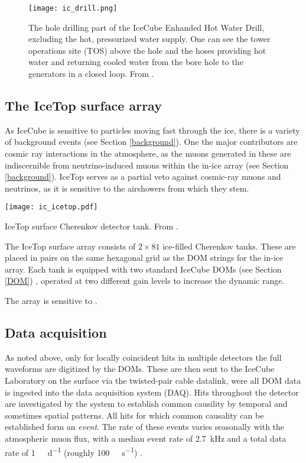 \begin{figure}[]
    \texttt{[image: ic\_drill.png]}
    \caption[IceCube enhanced hot water drill]{The hole drilling part of the IceCube Enhanded Hot Water Drill, excluding the hot, pressurized water supply. One can see the tower operations site (TOS) above the hole and the hoses providing hot water and returning cooled water from the bore hole to the generators in a closed loop. From \cite{Benson2014}.}
\end{figure}

\subsection{The IceTop surface array}
As IceCube is sensitive to particles moving fast through the ice, there is a variety of background events (see Section \ref{background}). One the major contributors are cosmic ray interactions in the atmosphere, as the muons generated in these are indiscernible from neutrino-induced muons within the in-ice array (see Section \ref{background}). IceTop serves as a partial veto against cosmic-ray muons and neutrinos, as it is sensitive to the airshowers from which they stem.

\begin{marginfigure}
    \texttt{[image: ic\_icetop.pdf]}
    \caption[IceTop detector]{IceTop surface Cherenkov detector tank. From \cite{Abbasi2013}.}
\end{marginfigure}

The IceTop surface array consists of $2\times81$ ice-filled Cherenkov tanks. These are placed in pairs on the same hexagonal grid as the DOM strings for the in-ice array. Each tank is equipped with two standard IceCube DOMs (see Section \ref{DOM}) \cite{Abbasi2013}, operated at two different gain levels to increase the dynamic range.

The array is sensitive to .

\subsection{Data acquisition}\label{data_acquisition}
As noted above, only for locally coincident hits in multiple detectors the full waveforms are digitized by the DOMs. These are then sent to the IceCube Laboratory on the surface via the twisted-pair cable datalink, were all DOM data is ingested into the data acquisition system (DAQ). Hits throughout the detector are investigated by the system to establish common causility by temporal and sometimes spatial patterns. All hits for which common causality can be established form an \textit{event}. The rate of these events varies seasonally with the atmospheric muon flux, with a median event rate of \SI{2.7}{\kilo\Hz} and a total data rate of \SI{1}{\tera\byte\per\day} (roughly \SI{100}{\mega\bit\per\second}) \cite{Aartsen2017}.

